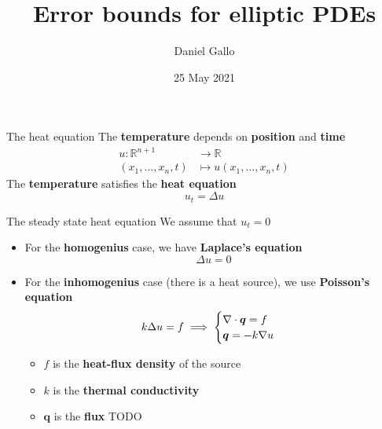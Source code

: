 \documentclass{beamer}
\title{Error bounds for elliptic PDEs}
\author{Daniel Gallo}
\institute{University of Bergen}
\date{25 May 2021}
\def\R{\mathbb{R}}
\begin{document}
    \begin{frame}
        \titlepage
    \end{frame}

    \begin{frame}{The heat equation}
        The \textbf{temperature} depends on \textbf{position} and \textbf{time}
        \begin{align*}
            u \colon \R^{n + 1} &\to \R \\
            (x_1, \dots, x_n, t) &\mapsto u(x_1, \dots, x_n, t)
        \end{align*}
        The \textbf{temperature} satisfies the \textbf{heat equation}
        \begin{equation*}
            u_t = \Delta u
        \end{equation*}
    \end{frame}

    \begin{frame}{The steady state heat equation}
        We assume that $u_t = 0$
        \begin{itemize}
            \item For the \textbf{homogenius} case, we have \textbf{Laplace's equation}
            \begin{equation*}
                \Delta u = 0
            \end{equation*}
            \item For the \textbf{inhomogenius} case (there is a heat source), we use \textbf{Poisson's equation}
            \begin{equation*}
                \-k \Delta u = f \implies
                \begin{cases}
                    \nabla \cdot \bm{q} = f \\
                    \bm{q} = -k \nabla u
                \end{cases}
            \end{equation*}
            \begin{itemize}
                \item $f$ is the \textbf{heat-flux density} of the source
                \item $k$ is the \textbf{thermal conductivity}
                \item $\bm{q}$ is the \textbf{flux} TODO
            \end{itemize}
        \end{itemize}
    \end{frame}
\end{document}
